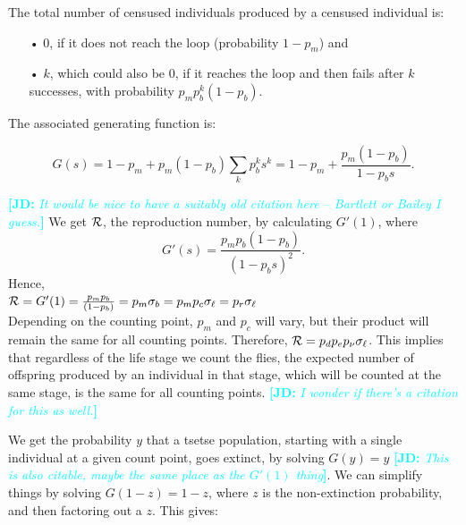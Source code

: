 \documentclass[smallextended]{svjour3}
\newcommand{\comment}[3]{\textcolor{#1}{\textbf{[#2: }\textit{#3}\textbf{]}}}
\newcommand{\jd}[1]{\comment{cyan}{JD}{#1}}
\newcommand{\eb}[1]{\comment{blue}{EB}{#1}}
\newcommand{\Rx}{\ensuremath{\cal R}}
\begin{document}
The total number of censused individuals produced by a censused individual is: 

\begin{itemize}
\item [•] 0, if it does not reach the loop (probability $1-p_m$) and
\item [•] $k$, which could also be 0, if it reaches the loop and then fails after $k$ successes, with probability $p_m p_b^k (1-p_b)$.\\
\end{itemize}  

The associated generating function is:

$$G(s) = 1-p_m + p_m (1-p_b) \sum_k p_b^k s^k = 1-p_m + \frac{p_m (1-p_b)}{1-p_b s}.$$

\jd{It would be nice to have a suitably old citation here -- Bartlett or Bailey I guess.} We get ${\cal R}$, the reproduction number, by calculating $G'(1)$, where $$G'(s) = \frac{p_m p_b (1-p_b)}{(1-p_b s)^2}.$$  Hence, \\

$ {\cal R}= G'(1) = \frac{p_m p_b}{(1-p_b)} = p_m \sigma_b = p_mp_c \sigma_\ell =  p_r\sigma_\ell$ \\
Depending on the counting point, $p_m$ and $p_c$ will vary, but their product will remain the same for all counting  points. Therefore, ${\cal R} =p_dp_ep_{\nu} \sigma_{\ell}$. This implies that regardless of the life stage we count the flies, the expected number of offspring produced by an individual in that stage, which will be counted at the same stage, is the same for all counting points. \jd{I wonder if there's a citation for this as well.} 

We get the probability $y$ that a tsetse population, starting with a single individual at a given count point, goes extinct, by solving $G(y) = y$ \jd{This is also citable, maybe the same place as the $G'(1)$ thing}. We can simplify things by solving   $G(1-z) = 1-z$, where $z$ is the non-extinction probability, and then factoring out a $z$. This gives:
\end{document}
